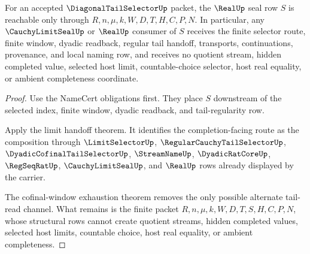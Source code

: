 \begin{theorem}
\label{thm:diagonal-tail-selector-seal-nonescape}
For an accepted $\DiagonalTailSelectorUp$ packet, the $\RealUp$ seal row $S$ is reachable only through $R,n,\mu,k,W,D,T,H,C,P,N$. In particular, any $\CauchyLimitSealUp$ or $\RealUp$ consumer of $S$ receives the finite selector route, finite window, dyadic readback, regular tail handoff, transports, continuations, provenance, and local naming row, and receives no quotient stream, hidden completed value, selected host limit, countable-choice selector, host real equality, or ambient completeness coordinate.
\end{theorem}
\begin{proof}
Use the NameCert obligations first. They place $S$ downstream of the selected index, finite window, dyadic readback, and tail-regularity row.

Apply the limit handoff theorem. It identifies the completion-facing route as the composition through $\LimitSelectorUp$, $\RegularCauchyTailSelectorUp$, $\DyadicCofinalTailSelectorUp$, $\StreamNameUp$, $\DyadicRatCoreUp$, $\RegSeqRatUp$, $\CauchyLimitSealUp$, and $\RealUp$ rows already displayed by the carrier.

The cofinal-window exhaustion theorem removes the only possible alternate tail-read channel. What remains is the finite packet $R,n,\mu,k,W,D,T,S,H,C,P,N$, whose structural rows cannot create quotient streams, hidden completed values, selected host limits, countable choice, host real equality, or ambient completeness.
\end{proof}

